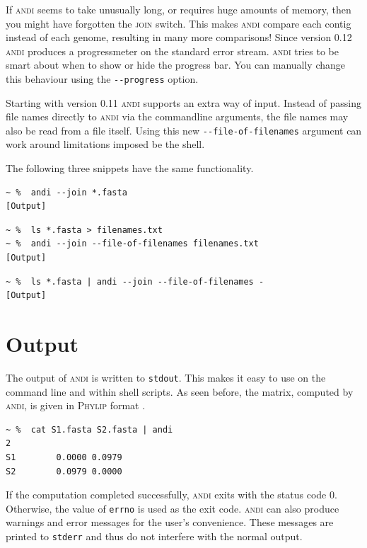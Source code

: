 \documentclass[a4paper,
  10pt,
  english,
  DIV=12,
  BCOR=8mm]{scrbook}
\newcommand{\algo}[1]{\textsc{{#1}}}
\newcommand{\andi}{\algo{andi}\xspace}
\begin{document}
If \andi seems to take unusually long, or requires huge amounts of memory, then you might have forgotten the \algo{join} switch. This makes \andi compare each contig instead of each genome, resulting in many more comparisons! Since version 0.12 \andi produces a progressmeter on the standard error stream. \andi tries to be smart about when to show or hide the progress bar. You can manually change this behaviour using the \lstinline!--progress! option.

Starting with version 0.11 \andi supports an extra way of input. Instead of passing file names directly to \andi via the commandline arguments, the file names may also be read from a file itself. Using this new \lstinline$--file-of-filenames$ argument can work around limitations imposed be the shell.

The following three snippets have the same functionality.

\begin{lstlisting}
~ %  andi --join *.fasta
[Output]
\end{lstlisting}

\begin{lstlisting}
~ %  ls *.fasta > filenames.txt
~ %  andi --join --file-of-filenames filenames.txt
[Output]
\end{lstlisting}

\begin{lstlisting}
~ %  ls *.fasta | andi --join --file-of-filenames -
[Output]
\end{lstlisting}

\section{Output}

The output of \andi is written to \lstinline$stdout$. This makes it easy to use on the command line and within shell scripts. As seen before, the matrix, computed by \algo{andi}, is given in \algo{Phylip} format \cite{phylip}.

\begin{lstlisting}
~ %  cat S1.fasta S2.fasta | andi
2
S1        0.0000 0.0979
S2        0.0979 0.0000
\end{lstlisting}

If the computation completed successfully, \andi exits with the status code 0. Otherwise, the value of \lstinline$errno$ is used as the exit code. \andi can also produce warnings and error messages for the user's convenience. These messages are printed to \lstinline$stderr$ and thus do not interfere with the normal output.
\end{document}
